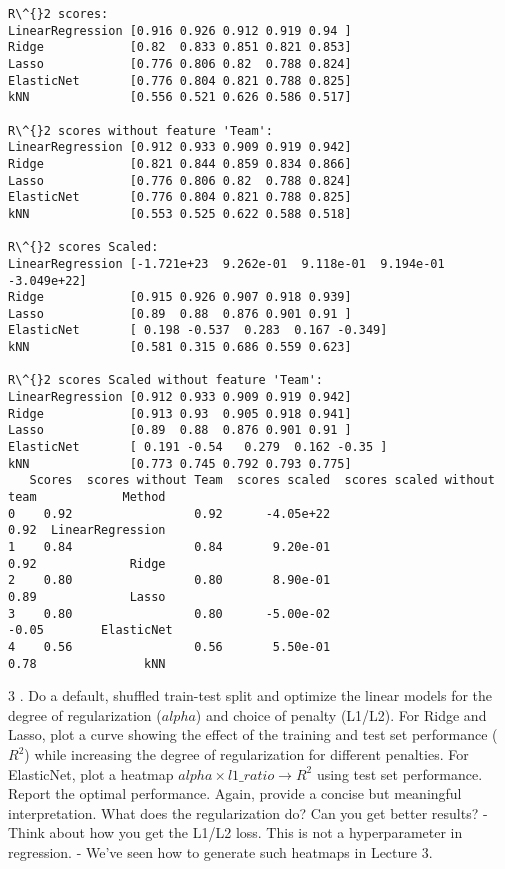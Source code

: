 \documentclass[11pt]{article}
\begin{document}
    \begin{Verbatim}[commandchars=\\\{\}]
R\^{}2 scores:
LinearRegression [0.916 0.926 0.912 0.919 0.94 ]
Ridge            [0.82  0.833 0.851 0.821 0.853]
Lasso            [0.776 0.806 0.82  0.788 0.824]
ElasticNet       [0.776 0.804 0.821 0.788 0.825]
kNN              [0.556 0.521 0.626 0.586 0.517]
 
R\^{}2 scores without feature 'Team':
LinearRegression [0.912 0.933 0.909 0.919 0.942]
Ridge            [0.821 0.844 0.859 0.834 0.866]
Lasso            [0.776 0.806 0.82  0.788 0.824]
ElasticNet       [0.776 0.804 0.821 0.788 0.825]
kNN              [0.553 0.525 0.622 0.588 0.518]

R\^{}2 scores Scaled:
LinearRegression [-1.721e+23  9.262e-01  9.118e-01  9.194e-01 -3.049e+22]
Ridge            [0.915 0.926 0.907 0.918 0.939]
Lasso            [0.89  0.88  0.876 0.901 0.91 ]
ElasticNet       [ 0.198 -0.537  0.283  0.167 -0.349]
kNN              [0.581 0.315 0.686 0.559 0.623]

R\^{}2 scores Scaled without feature 'Team':
LinearRegression [0.912 0.933 0.909 0.919 0.942]
Ridge            [0.913 0.93  0.905 0.918 0.941]
Lasso            [0.89  0.88  0.876 0.901 0.91 ]
ElasticNet       [ 0.191 -0.54   0.279  0.162 -0.35 ]
kNN              [0.773 0.745 0.792 0.793 0.775]
   Scores  scores without Team  scores scaled  scores scaled without team            Method
0    0.92                 0.92      -4.05e+22                        0.92  LinearRegression
1    0.84                 0.84       9.20e-01                        0.92             Ridge
2    0.80                 0.80       8.90e-01                        0.89             Lasso
3    0.80                 0.80      -5.00e-02                       -0.05        ElasticNet
4    0.56                 0.56       5.50e-01                        0.78               kNN

    \end{Verbatim}

    3 . Do a default, shuffled train-test split and optimize the linear
models for the degree of regularization (\(alpha\)) and choice of
penalty (L1/L2). For Ridge and Lasso, plot a curve showing the effect of
the training and test set performance (\(R^2\)) while increasing the
degree of regularization for different penalties. For ElasticNet, plot a
heatmap \(alpha \times l1\_ratio \rightarrow R^2\) using test set
performance. Report the optimal performance. Again, provide a concise
but meaningful interpretation. What does the regularization do? Can you
get better results? - Think about how you get the L1/L2 loss. This is
not a hyperparameter in regression. - We've seen how to generate such
heatmaps in Lecture 3.
\end{document}
